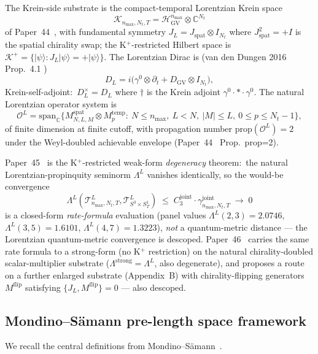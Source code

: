 \documentclass[11pt,a4paper]{article}
\theoremstyle{plain}
\theoremstyle{definition}
\newcommand{\nmax}{n_{\max}}
\newcommand{\Nt}{N_{t}}
\newcommand{\Manifold}{S^{3}\times S^{1}_{T}}
\newcommand{\Krein}{\mathcal{K}}
\newcommand{\Op}{\mathcal{O}}
\newcommand{\Tcal}{\mathcal{T}}
\newcommand{\C}{\mathbb{C}}
\newcommand{\DGV}{D_{\mathrm{GV}}}
\newcommand{\DL}{D_{L}}
\newcommand{\JL}{J_{L}}
\newcommand{\HGV}{\mathcal{H}_{\mathrm{GV}}}
\newcommand{\Kplus}{\Krein^{+}}
\newcommand{\spat}{\mathrm{spat}}
\newcommand{\temp}{\mathrm{temp}}
\newcommand{\gammajoint}{\gamma^{\mathrm{joint}}}
\newcommand{\Cthreejoint}{C_{3}^{\mathrm{joint}}}
\newcommand{\Lprop}{\Lambda^{L}}
\begin{document}
The Krein-side substrate is the compact-temporal Lorentzian Krein
space
\[
\Krein_{\nmax, \Nt, T}
= \HGV^{\nmax} \otimes \C^{\Nt}
\]
of Paper~44~\cite{paper44}, with fundamental symmetry $\JL = J_{\spat}
\otimes I_{\Nt}$ where $J_{\spat}^{2} = +I$ is the spatial chirality
swap; the K$^{+}$-restricted Hilbert space is
$\Kplus = \{|\psi\rangle : \JL |\psi\rangle = +|\psi\rangle\}$.
The Lorentzian Dirac is (van den Dungen 2016 Prop.~4.1
\cite{vandungen2016})
\[
\DL = i\bigl(\gamma^{0}\otimes \partial_{t} + \DGV \otimes I_{\Nt}\bigr),
\]
Krein-self-adjoint:\ $\DL^{\times} = \DL$ where $\dagger$ is the
Krein adjoint $\gamma^{0}\cdot *\cdot\gamma^{0}$. The natural Lorentzian
operator system is
\[
\Op^{L} = \mathrm{span}_{\C}\{M^{\spat}_{N, L, M} \otimes M^{\temp}_{p}
:\ N \le \nmax,\ L < N,\ |M| \le L,\ 0 \le p \le \Nt - 1\},
\]
of finite dimension at finite cutoff, with propagation number
$\mathrm{prop}(\Op^{L}) = 2$ under the Weyl-doubled achievable envelope
(Paper~44~\cite{paper44} Prop.~prop=2).

Paper~45~\cite{paper45} is the K$^{+}$-restricted weak-form
\emph{degeneracy} theorem:\ the natural Lorentzian-propinquity seminorm
$\Lprop$ vanishes identically, so the would-be convergence
\[
\Lprop(\Tcal^{L}_{\nmax, \Nt, T}, \Tcal^{L}_{\Manifold})
\;\le\; \Cthreejoint \cdot \gammajoint_{\nmax, \Nt, T} \;\to\; 0
\]
is a closed-form \emph{rate-formula} evaluation (panel values
$\Lprop(2,3) = 2.0746$, $\Lprop(3,5) = 1.6101$, $\Lprop(4,7) = 1.3223$),
\emph{not} a quantum-metric distance --- the Lorentzian quantum-metric
convergence is descoped. Paper~46~\cite{paper46}
carries the same rate formula to a strong-form (no K$^{+}$ restriction)
on the natural chirality-doubled scalar-multiplier substrate
($\Lambda^{\mathrm{strong}} = \Lprop$, also degenerate), and proposes a
route on a further enlarged substrate (Appendix~B) with
chirality-flipping generators $M^{\mathrm{flip}}$ satisfying
$\{\JL, M^{\mathrm{flip}}\} = 0$ --- also descoped.

\subsection{Mondino--S\"amann pre-length space
framework}\label{sec:mondino_samann_recap}

We recall the central definitions from
Mondino--S\"amann~\cite{mondino_samann2025_pointed}.
\end{document}

